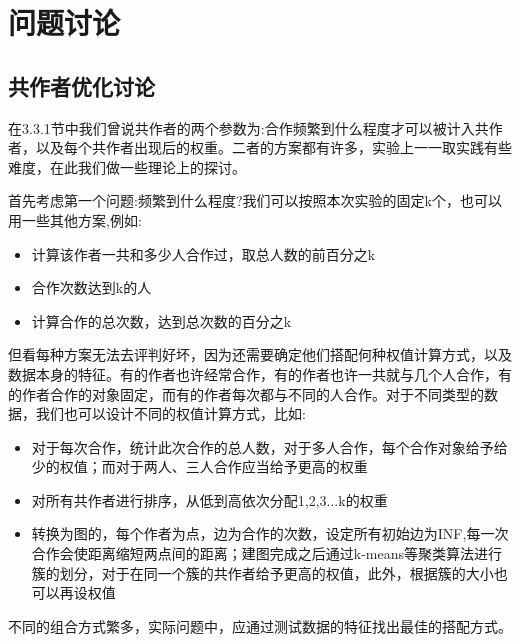 \documentclass{mcmthesis}
\begin{document}
\section{问题讨论}
\subsection{共作者优化讨论}
\par 在3.3.1节中我们曾说共作者的两个参数为:合作频繁到什么程度才可以被计入共作者，以及每个共作者出现后的权重。二者的方案都有许多，实验上一一取实践有些难度，在此我们做一些理论上的探讨。
\par 首先考虑第一个问题:频繁到什么程度?我们可以按照本次实验的固定k个，也可以用一些其他方案,例如:
\begin{itemize}
	\item 计算该作者一共和多少人合作过，取总人数的前百分之k
	\item 合作次数达到k的人
	\item 计算合作的总次数，达到总次数的百分之k
\end{itemize}
\par 但看每种方案无法去评判好坏，因为还需要确定他们搭配何种权值计算方式，以及数据本身的特征。有的作者也许经常合作，有的作者也许一共就与几个人合作，有的作者合作的对象固定，而有的作者每次都与不同的人合作。对于不同类型的数据，我们也可以设计不同的权值计算方式，比如:
\begin{itemize}
	\item 对于每次合作，统计此次合作的总人数，对于多人合作，每个合作对象给予给少的权值；而对于两人、三人合作应当给予更高的权重
	\item 对所有共作者进行排序，从低到高依次分配1,2,3...k的权重
	\item 转换为图的，每个作者为点，边为合作的次数，设定所有初始边为INF,每一次合作会使距离缩短两点间的距离；建图完成之后通过k-means等聚类算法进行簇的划分，对于在同一个簇的共作者给予更高的权值，此外，根据簇的大小也可以再设权值
\end{itemize}
\par 不同的组合方式繁多，实际问题中，应通过测试数据的特征找出最佳的搭配方式。
\end{document}
